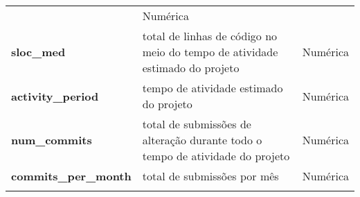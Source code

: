 \documentclass[]{article}
\begin{document}
\begin{longtable}[]{@{}lll@{}}
\begin{minipage}[t]{0.61\columnwidth}
\end{minipage} & \begin{minipage}[t]{0.10\columnwidth}\raggedright\strut
Numérica\strut
\end{minipage}\tabularnewline
\begin{minipage}[t]{0.21\columnwidth}\raggedright\strut
\textbf{sloc\_med}\strut
\end{minipage} & \begin{minipage}[t]{0.61\columnwidth}\raggedright\strut
total de linhas de código no meio do tempo de atividade estimado do
projeto\strut
\end{minipage} & \begin{minipage}[t]{0.10\columnwidth}\raggedright\strut
Numérica\strut
\end{minipage}\tabularnewline
\begin{minipage}[t]{0.21\columnwidth}\raggedright\strut
\textbf{activity\_period}\strut
\end{minipage} & \begin{minipage}[t]{0.61\columnwidth}\raggedright\strut
tempo de atividade estimado do projeto\strut
\end{minipage} & \begin{minipage}[t]{0.10\columnwidth}\raggedright\strut
Numérica\strut
\end{minipage}\tabularnewline
\begin{minipage}[t]{0.21\columnwidth}\raggedright\strut
\textbf{num\_commits}\strut
\end{minipage} & \begin{minipage}[t]{0.61\columnwidth}\raggedright\strut
total de submissões de alteração durante todo o tempo de atividade do
projeto\strut
\end{minipage} & \begin{minipage}[t]{0.10\columnwidth}\raggedright\strut
Numérica\strut
\end{minipage}\tabularnewline
\begin{minipage}[t]{0.21\columnwidth}\raggedright\strut
\textbf{commits\_per\_month}\strut
\end{minipage} & \begin{minipage}[t]{0.61\columnwidth}\raggedright\strut
total de submissões por mês\strut
\end{minipage} & \begin{minipage}[t]{0.10\columnwidth}\raggedright\strut
Numérica\strut
\end{minipage}\tabularnewline
\begin{minipage}[t]{0.21\columnwidth}\raggedright\strut

\end{minipage}
\end{longtable}
\end{document}
